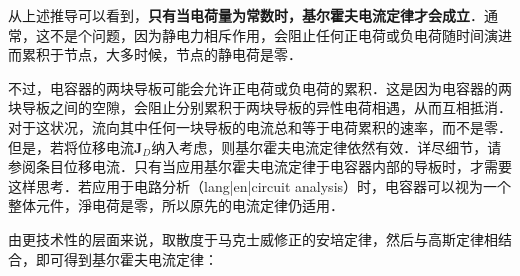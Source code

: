 从上述推导可以看到，\textbf{只有当电荷量为常数时，基尔霍夫电流定律才会成立}．通常，这不是个问题，因为静电力相斥作用，会阻止任何正电荷或负电荷随时间演进而累积于节点，大多时候，节点的静电荷是零．

不过，电容器的两块导板可能会允许正电荷或负电荷的累积．这是因为电容器的两块导板之间的空隙，会阻止分别累积于两块导板的异性电荷相遇，从而互相抵消．对于这状况，流向其中任何一块导板的电流总和等于电荷累积的速率，而不是零．但是，若将位移电流$\mathbf{J}_D$纳入考虑，则基尔霍夫电流定律依然有效．详尽细节，请参阅条目位移电流．只有当应用基尔霍夫电流定律于电容器内部的导板时，才需要这样思考．若应用于电路分析（lang|en|circuit analysis）时，电容器可以视为一个整体元件，淨电荷是零，所以原先的电流定律仍适用．

由更技术性的层面来说，取散度于马克士威修正的安培定律，然后与高斯定律相结合，即可得到基尔霍夫电流定律：
